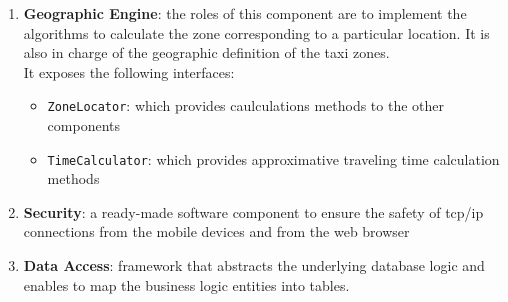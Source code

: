 \begin{enumerate}
\begin{itemize}
	\end{itemize}
	\item \textbf{Geographic Engine}: the roles of this component are to implement the algorithms to calculate the zone corresponding to a particular location. It is also in charge of the geographic definition of the taxi zones.\\It exposes the following interfaces:
	\begin{itemize}
		\item \texttt{ZoneLocator}: which provides caulculations methods to the other components
		\item \texttt{TimeCalculator}: which provides approximative traveling time calculation methods
	\end{itemize}
	\item \textbf{Security}: a ready-made software component to ensure the safety of tcp/ip connections from the mobile devices and from the web browser
	\item \textbf{Data Access}: framework that abstracts the underlying database logic and enables to map the business logic entities into tables.
\end{enumerate}